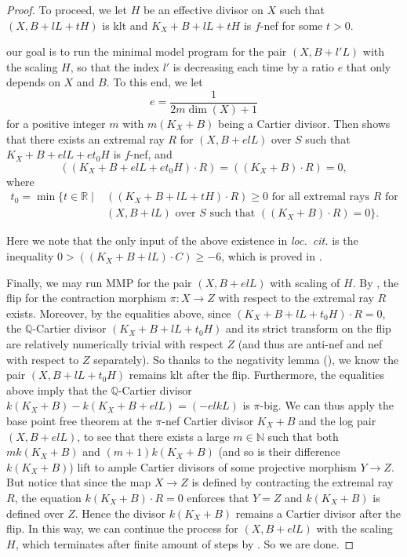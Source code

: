 \documentclass[11pt, letterpaper]{amsart}
\theoremstyle{plain}
\theoremstyle{definition}
\newcommand{\<}{\langle}
\renewcommand{\>}{\rangle}
\begin{document}
\begin{proof}
	
	To proceed, we let $H$ be an effective divisor on $X$ such that $(X,B+lL+tH)$ is klt and $K_X+B+lL+tH$ is $f$-nef for some $t>0$.

	our goal is to run the minimal model program for the pair $(X,B+l'L)$ with the scaling $H$, so that the index $l'$ is decreasing each time by a ratio $e$ that only depends on $X$ and $B$.
	To this end, we let $$e=\frac{1}{2m \dim(X)+1}$$ for a positive integer $m$ with $m(K_X+B)$ being a Cartier divisor.
	Then \cite[Lem.~2]{Kawamata} shows that there exists an extremal ray $R$ for $(X,B+elL)$ over $S$ such that $K_X+B+elL+et_0H$ is $f$-nef, and
	\[
	((K_X+B+elL+et_0H)\cdot R) = ((K_X+B)\cdot R) =0,
	\]
	where 
	\begin{align*}
	     t_0=\min\{t\in \mathbb{R} \mid &((K_X+B+lL+tH)\cdot R)\geq 0 \text{ for all extremal rays } R \text{ for } \\ &(X,B+lL) \text{ over } S \text{ such that } ((K_X+B)\cdot R)=0\}.
	\end{align*}
    
	Here we note that the only input of the above existence in \textit{loc.\ cit.} is the inequality $0>((K_X+B+lL)\cdot C) \geq -6$, which is proved in \cite[Thm.~1.4]{HW-MMP}.
	
	
	Finally, we may run MMP for the pair $(X,B+elL)$ with scaling of $H$.
	By \cite[Thm.~1.1]{HW-MMP}, the flip for the contraction morphism $\pi: X\to Z$ with respect to the extremal ray $R$ exists.
	Moreover, by the equalities above, since  $(K_X+B+lL+t_0H)\cdot R=0$, the $\mathbb{Q}$-Cartier divisor $(K_X+B+lL+t_0H)$ and its strict transform on the flip are relatively numerically trivial with respect $Z$ (and thus are anti-nef and nef with respect to $Z$ separately). 
	So thanks to the negativity lemma (\cite[Lem.~3.38]{KM98}), we know  the pair $(X,B+lL+t_0H)$ remains klt after the flip.
	Furthermore, the equalities above imply that the $\mathbb{Q}$-Cartier divisor $k(K_X+B)-k(K_X+B+elL)=(-elkL)$ is $\pi$-big.
	We can thus apply the base point free theorem  \cite[Cor.~1.5]{ABL22} at the $\pi$-nef Cartier divisor $K_X+B$ and the log pair $(X, B+elL)$, to see that there exists a large $m\in \mathbb{N}$ such that both $mk(K_X+B)$ and $(m+1)k(K_X+B)$ (and so is their difference $k(K_X+B)$) lift to ample Cartier divisors of some projective morphism $Y\to Z$.
	But notice that since the map $X\to Z$ is defined by contracting the extremal ray $R$, the equation $k(K_X+B)\cdot R=0$ enforces that $Y=Z$ and $k(K_X+B)$ is defined over $Z$.
	Hence the divisor $k(K_X+B)$ remains a Cartier divisor after the flip.
	In this way, we can continue the process for $(X,B+elL)$ with the scaling $H$, which terminates after finite amount of steps by \cite[Thm.~1.2]{HW-MMP}.
	So we are done.\end{proof}
\end{document}
